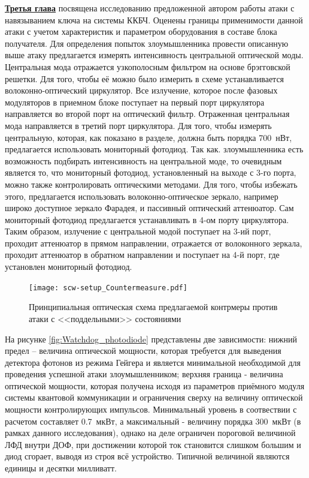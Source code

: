  \underline{\textbf{Третья глава}} посвящена исследованию предложенной автором работы атаки с навязыванием ключа на системы ККБЧ. Оценены границы применимости данной атаки с учетом характеристик и параметром оборудования в составе блока получателя. Для определения попыток злоумышленника провести описанную выше атаку предлагается измерять интенсивность центральной оптической моды. Центральная мода отражается узкополосным фильтром на основе брэгговской решетки. Для того, чтобы её можно было измерить в схеме устанавливается волоконно-оптический циркулятор. Все излучение, которое после фазовых модуляторов в приемном блоке поступает на первый порт циркулятора направляется во второй порт на оптический фильтр. Отраженная центральная мода направляется в третий порт циркулятора. Для того, чтобы измерять центральную, которая, как показано в разделе, должна быть порядка 700~нВт, предлагается использовать мониторный фотодиод. Так как. злоумышленника есть возможность подбирать интенсивность на центральной моде, то очевидным является то, что мониторный фотодиод, установленный на выходе с 3-го порта, можно также контролировать оптическими методами. Для того, чтобы избежать этого, предлагается использовать волоконно-оптическое зеркало, например широко доступное зеркало Фарадея, и пассивный оптический аттенюатор. Сам мониторный фотодиод предлагается устанавливать в 4-ом порту циркулятора. Таким образом, излучение с центральной модой поступает на 3-ий порт, проходит аттенюатор в прямом направлении, отражается от волоконного зеркала, проходит аттенюатор в обратном направлении и поступает на 4-й порт, где установлен мониторный фотодиод.         
 \begin{figure}[ht]
  \centering
  \texttt{[image: scw-setup\_Countermeasure.pdf]}
  \caption{Принципиальная оптическая схема предлагаемой контрмеры против атаки с <<поддельными>> состояниями}
  \label{fig:countermeasure}
\end{figure}
 
 На рисунке \ref{fig:Watchdog_photodiode} представлены две зависимости: нижний предел -- величина оптической мощности, которая требуется для выведения детектора фотонов из режима Гейгера и является минимальной необходимой для проведения успешной атаки злоумышленником; верхняя граница - величина оптической мощности, которая получена исходя из параметров приёмного модуля системы квантовой коммуникации и ограничения сверху на величину оптической мощности контролирующих импульсов. Минимальный уровень в соотвествии с расчетом составляет 0.7~мкВт, а максимальный - величину порядка 300~мкВт (в рамках данного исследования), однако на деле ограничен пороговой величиной ЛФД внутри ДОФ, при достижении которой ток становится слишком большим и диод сгорает, выводя из строя всё устройство. Типичной величиной являются единицы и десятки милливатт. 


